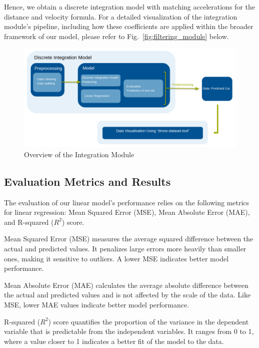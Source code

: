 Hence, we obtain a discrete integration model with matching accelerations for the distance and velocity formula. For a detailed visualization of the integration module's pipeline, including how these coefficients are applied within the broader framework of our model, please refer to Fig.~\ref{fig:filtering_module} below.

\begin{figure}[h]
\centering
\includegraphics[width=\columnwidth]{./images/figures/integration_module.png}
\caption{Overview of the Integration Module}
\label{fig:Integration_module}
\end{figure}


\subsection{Evaluation Metrics and Results}

The evaluation of our linear model's performance relies on the following metrics for linear regression: Mean Squared Error (MSE), Mean Absolute Error (MAE), and R-squared ($R^2$) score.

Mean Squared Error (MSE) measures the average squared difference between the actual and predicted values. It penalizes large errors more heavily than smaller ones, making it sensitive to outliers. A lower MSE indicates better model performance.

Mean Absolute Error (MAE) calculates the average absolute difference between the actual and predicted values and is
not affected by the scale of the data. Like MSE, lower MAE values indicate better model performance.

R-squared ($R^2$) score quantifies the proportion of the variance in the dependent variable that is predictable 
from the independent variables. 
It ranges from 0 to 1, where a value closer to 1 indicates a better fit of the model to the data. 

